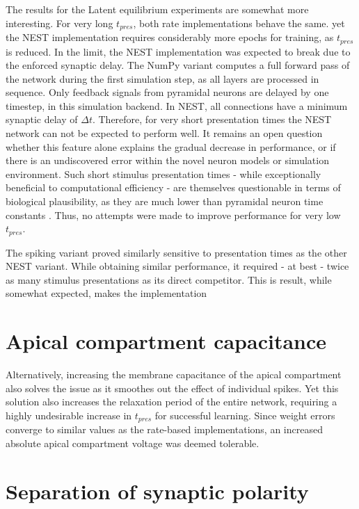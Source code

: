The results for the Latent equilibrium experiments are somewhat more interesting. For very long $t_{pres}$, both rate
implementations behave the same. yet the NEST implementation requires considerably more epochs for training, as
$t_{pres}$ is reduced. In the limit, the NEST implementation was expected to break due to the enforced synaptic delay.
The NumPy variant computes a full forward pass of the network during the first simulation step, as all layers are
processed in sequence. Only feedback signals from pyramidal neurons are delayed by one timestep, in this simulation
backend. In NEST, all connections have a minimum synaptic delay of $\Delta t$. Therefore, for very short presentation
times the NEST network can not be expected to perform well. It remains an open question whether this feature alone
explains the gradual decrease in performance, or if there is an undiscovered error within the novel neuron models or
simulation environment. Such short stimulus presentation times - while exceptionally beneficial to computational
efficiency - are themselves questionable  in terms of biological plausibility, as they are much lower than pyramidal
neuron time constants \citep{McCormick1985}. Thus, no attempts were made to improve performance for very low $t_{pres}$.

The spiking variant proved similarly sensitive to presentation times as the other NEST variant. While obtaining similar
performance, it required - at best - twice as many stimulus presentations as its direct competitor. This is result, 
while somewhat expected, makes the implementation \todo{}



\section{Apical compartment capacitance}\label{sec-c-m-api}


Alternatively, increasing the membrane capacitance of the apical compartment also solves the issue as it smoothes out
the effect of individual spikes. Yet this solution also increases the relaxation period of the entire network, requiring
a highly undesirable increase in $t_{pres}$ for successful learning. Since weight errors converge to similar values as
the rate-based implementations, an increased absolute apical compartment voltage was deemed tolerable.




\section{Separation of synaptic polarity}

